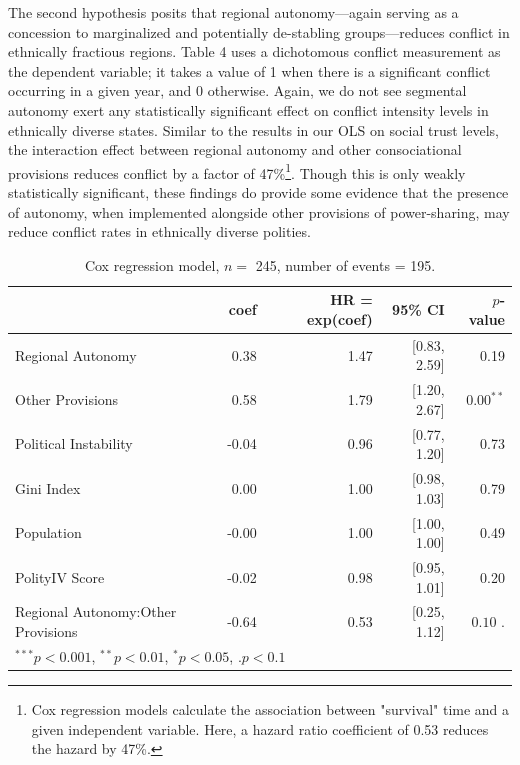 \documentclass[12pt]{article}
\begin{document}
The second hypothesis posits that regional autonomy---again serving as a concession to marginalized and potentially de-stabling groups---reduces conflict in ethnically fractious regions. Table 4 uses a dichotomous conflict measurement as the dependent variable; it takes a value of 1 when there is a significant conflict occurring in a given year, and 0 otherwise. Again, we do not see segmental autonomy exert any statistically significant effect on conflict intensity levels in ethnically diverse states. Similar to the results in our OLS on social trust levels, the interaction effect between regional autonomy and other consociational provisions reduces conflict by a factor of 47\%\footnote{Cox regression models calculate the association between "survival" time and a given independent variable. Here, a hazard ratio coefficient of 0.53 reduces the hazard by 47\%.}. Though this is only weakly statistically significant, these findings do provide some evidence that the presence of autonomy, when implemented alongside other provisions of power-sharing, may reduce conflict rates in ethnically diverse polities. 

\begin{table}[!htbp]
	\centering
	\begin{tabular}{lrrrr}
		\hline
		& coef & HR = exp(coef) & 95\% CI & $p$-value \\ 
		\hline
		Regional Autonomy & 0.38 & 1.47 & [0.83, 2.59] & 0.19 \\ 
		Other Provisions & 0.58 & 1.79 & [1.20, 2.67] & $0.00^{**}$ \\ 
		Political Instability & -0.04 & 0.96 & [0.77, 1.20] & 0.73 \\ 
		Gini Index & 0.00 & 1.00 & [0.98, 1.03] & 0.79 \\ 
		Population & -0.00 & 1.00 & [1.00, 1.00] & 0.49 \\ 
		PolityIV Score & -0.02 & 0.98 & [0.95, 1.01] & 0.20 \\ 
		Regional Autonomy:Other Provisions & -0.64 & 0.53 & [0.25, 1.12] & $0.10 {\textbf{ .}}$ \\ 
		\hline
		\multicolumn{4}{l}{\scriptsize{$^{***}p<0.001$, $^{**}p<0.01$, $^*p<0.05$, $\textbf{.}p<0.1$}}
	\end{tabular}
	\caption{Cox regression model, $n = $ 245, number of events = 195.} 
	\label{mod}
\end{table}
\end{document}
